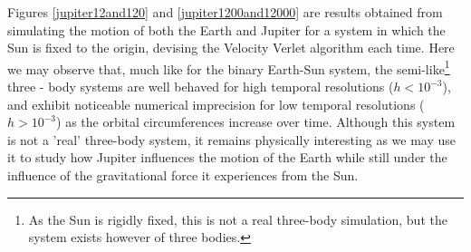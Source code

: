 	\newpage
	 Figures \ref{jupiter12and120} and \ref{jupiter1200and12000} are results obtained from simulating the motion of both the Earth and Jupiter for a system in which the Sun is fixed to the origin, devising the Velocity Verlet algorithm each time. Here we may observe that, much like for the binary Earth-Sun system, the semi-like\footnote{As the Sun is rigidly fixed, this is not a real three-body simulation, but the system exists however of three bodies.} three - body systems are well behaved for high temporal resolutions ($h < 10^{-3}$), and exhibit noticeable numerical imprecision for low temporal resolutions ($h > 10^{-3}$) as the orbital circumferences increase over time. Although this system is not a 'real' three-body system, it remains physically interesting as we may use it to study how Jupiter influences the motion of the Earth while still under the influence of the gravitational force it experiences from the Sun.
	 
